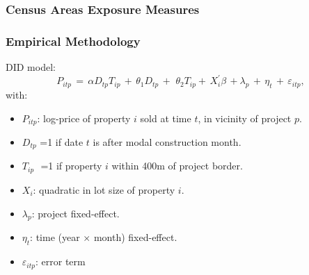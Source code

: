 \documentclass[aspectratio=149]{beamer}
\begin{document}
\begin{frame}
\frametitle{Census Areas Exposure Measures}
\begin{center}
\begin{figure}
\vspace{-3mm}
\end{figure}
\end{center}
\end{frame}





\begin{frame}
\frametitle{Empirical Methodology}
DID model:
\begin{equation*}
P_{itp} \, = \, \alpha D_{tp}T_{ip} \, + \,\theta_1 D_{tp} \, + \, \,\theta_2 T_{ip}+ \, X^{'}_{i}\beta \, +  \lambda_p \,  + \, \eta_{t} \, + \, \varepsilon_{itp} ,
\end{equation*}
with:
\begin{itemize}
\item $P_{itp}$: log-price of property $i$ sold at time $t$, in vicinity of project $p$.
\item $D_{tp}$ =1 if date $t$ is after modal construction month. 
\item $T_{ip}\,\,$ =1 if property $i$ within 400m of project border.
\item $X_{i}$: quadratic in lot size of property $i$.
\item $\lambda_p$: project fixed-effect.
\item $\eta_{t}$: time (year$\,\times\,$month) fixed-effect.

\item $\varepsilon_{itp}$: error term
\end{itemize}
\end{frame}

\end{document}
